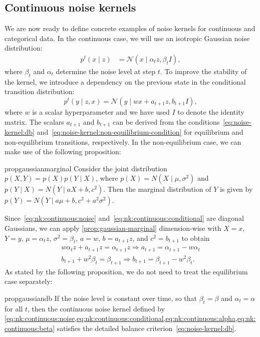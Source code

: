 \documentclass[10pt,twocolumn,letterpaper]{article}
\begin{document}
\subsection{Continuous noise kernels}\label{sec:nk:continuous}

We are now ready to define concrete examples of noise kernels for continuous and categorical data.
In the continuous case, we will use an isotropic Gaussian noise distribution:
\begin{align}
  \label{eq:nk:continuous:noise}
  p^{t}(x \mid z)
  & = \mathcal{N}\left(x \mid \alpha_{t} z, \beta_{t} I \right)
  ,
\end{align}
where $\beta_{t}$ and $\alpha_{t}$ determine the noise level at step $t$.
To improve the stability of the kernel, we introduce a dependency on the previous state in the conditional transition distribution:
\begin{equation}
  p^{t}(y \mid z, x) = \mathcal{N}(
  y \mid
  w x + a_{t+1}z
  ,
  b_{t+1}I
  )
  \label{eq:nk:continuous:conditional}
  ,
\end{equation}
where $w$ is a scalar hyperparameter and we have used $I$ to denote the identity matrix.
The scalars $a_{t+1}$ and $b_{t+1}$ can be derived from the conditions~\eqref{eq:noise-kernel:db} and~\eqref{eq:noise-kernel:non-equilibrium-condition} for equilibrium and non-equilibrium transitions, respectively.
In the non-equilibrium case, we can make use of the following proposition:
\begin{restatable}{prop}{gaussianmarginal}\label{prop:gaussian-marginal}
  Consider the joint distribution $p(X,Y) = p(X)p(Y \mid X)$, where $p(X) = N(X \mid \mu, \sigma^{2})$ and $p(Y \mid X) = N(Y \mid aX + b, c^{2})$.
  Then the marginal distribution of $Y$ is given by $p(Y) = N(Y \mid a \mu + b, c^{2} + a^{2}\sigma^{2})$.
\end{restatable}

Since~\eqref{eq:nk:continuous:noise} and~\eqref{eq:nk:continuous:conditional} are diagonal Gaussians, we can apply \cref{prop:gaussian-marginal} dimension-wise with $X = x$, $Y = y$, $\mu = \alpha_{t}z$, $\sigma^{2} = \beta_{t}$, $a = w$, $b = a_{t+1} z$, and $c^{2} = b_{t+1}$ to obtain
\begin{align}
  w \alpha_{t}z + a_{t+1}z = \alpha_{t+1}z
  \Rightarrow
    a_{t+1} = \alpha_{t+1} - w \alpha_{t}
  \label{eq:nk:continuous:alpha}
  \\
  b_{t+1} + w^{2} \beta_{t} = \beta_{t+1}
  \Rightarrow
  b_{t+1} = \beta_{t+1} - w^{2} \beta_{t}
  \label{eq:nk:continuous:beta}
  .
\end{align}
As stated by the following proposition, we do not need to treat the equilibrium case separately:
\begin{restatable}{prop}{gaussiandb}\label{prop:gaussian-db}
  If the noise level is constant over time, so that $\beta_{t} = \beta$ and $\alpha_{t} = \alpha$ for all $t$, then the continuous noise kernel defined by \cref*{eq:nk:continuous:noise,eq:nk:continuous:conditional,eq:nk:continuous:alpha,eq:nk:continuous:beta} satisfies the detailed balance criterion~\eqref{eq:noise-kernel:db}.
\end{restatable}
\end{document}
